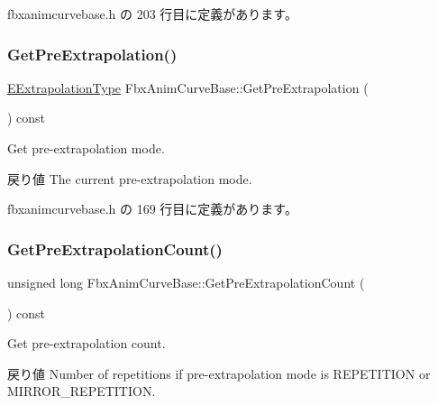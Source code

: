  fbxanimcurvebase.\+h の 203 行目に定義があります。

\mbox{\label{class_fbx_anim_curve_base_a3d4ba8f60385e14877c370518acea5d3}} 
\subsubsection{\texorpdfstring{Get\+Pre\+Extrapolation()}{GetPreExtrapolation()}}
{\footnotesize\ttfamily \hyperlink{class_fbx_anim_curve_base_aa7214d43daa7b6b9b47a8118a858847f}{E\+Extrapolation\+Type} Fbx\+Anim\+Curve\+Base\+::\+Get\+Pre\+Extrapolation (\begin{DoxyParamCaption}{ }\end{DoxyParamCaption}) const\hspace{0.3cm}{\ttfamily [inline]}}

Get pre-\/extrapolation mode. \begin{DoxyReturn}{戻り値}
The current pre-\/extrapolation mode. 
\end{DoxyReturn}


 fbxanimcurvebase.\+h の 169 行目に定義があります。

\mbox{\label{class_fbx_anim_curve_base_a2b8d645a376937f0aa645e25373976e0}} 
\subsubsection{\texorpdfstring{Get\+Pre\+Extrapolation\+Count()}{GetPreExtrapolationCount()}}
{\footnotesize\ttfamily unsigned long Fbx\+Anim\+Curve\+Base\+::\+Get\+Pre\+Extrapolation\+Count (\begin{DoxyParamCaption}{ }\end{DoxyParamCaption}) const\hspace{0.3cm}{\ttfamily [inline]}}

Get pre-\/extrapolation count. \begin{DoxyReturn}{戻り値}
Number of repetitions if pre-\/extrapolation mode is R\+E\+P\+E\+T\+I\+T\+I\+ON or M\+I\+R\+R\+O\+R\+\_\+\+R\+E\+P\+E\+T\+I\+T\+I\+ON. 
\end{DoxyReturn}


